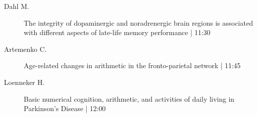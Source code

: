 \begin{symposium}
\begin{description}
                \item [ Dahl M.] The integrity of dopaminergic and noradrenergic brain regions is associated with different aspects of late-life memory performance \textcolor{mygray}{ | 11:30}    
                
                \item [ Artemenko C.] Age-related changes in arithmetic in the fronto-parietal network \textcolor{mygray}{ | 11:45}    
                
                \item [ Loenneker H.] Basic numerical cognition, arithmetic, and activities of daily living in Parkinson’s Disease \textcolor{mygray}{ | 12:00}    
                
            \end{description} 
            \end{symposium}
            